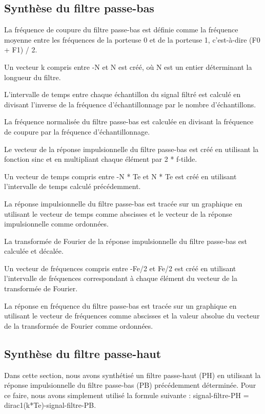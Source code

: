 \documentclass[frenchb]{article}
\begin{document}
\begin{itemize}
        \subsection{Synthèse du filtre passe-bas}
                La fréquence de coupure du filtre passe-bas est définie comme la fréquence moyenne entre les fréquences de la porteuse 0 et de la porteuse 1, c'est-à-dire (F0 + F1) / 2.
                
                Un vecteur k compris entre -N et N est créé, où N est un entier déterminant la longueur du filtre.
                
                L'intervalle de temps entre chaque échantillon du signal filtré est calculé en divisant l'inverse de la fréquence d'échantillonnage par le nombre d'échantillons.
                
                La fréquence normalisée du filtre passe-bas est calculée en divisant la fréquence de coupure par la fréquence d'échantillonnage.
                
                Le vecteur de la réponse impulsionnelle du filtre passe-bas est créé en utilisant la fonction sinc et en multipliant chaque élément par 2 * f-tilde.
                
                Un vecteur de temps compris entre -N * Te et N * Te est créé en utilisant l'intervalle de temps calculé précédemment.
                
                La réponse impulsionnelle du filtre passe-bas est tracée sur un graphique en utilisant le vecteur de temps comme abscisses et le vecteur de la réponse impulsionnelle comme ordonnées.
                
                La transformée de Fourier de la réponse impulsionnelle du filtre passe-bas est calculée et décalée.
                
                Un vecteur de fréquences compris entre -Fe/2 et Fe/2 est créé en utilisant l'intervalle de fréquences correspondant à chaque élément du vecteur de la transformée de Fourier.
                
                La réponse en fréquence du filtre passe-bas est tracée sur un graphique en utilisant le vecteur de fréquences comme abscisses et la valeur absolue du vecteur de la transformée de Fourier comme ordonnées.

        \subsection{Synthèse du filtre passe-haut}
        Dans cette section, nous avons synthétisé un filtre passe-haut (PH) en utilisant la réponse impulsionnelle du filtre passe-bas (PB) précédemment déterminée. Pour ce faire, nous avons simplement utilisé la formule suivante : signal-filtre-PH = dirac1(k*Te)-signal-filtre-PB.


\end{itemize}
\end{document}
